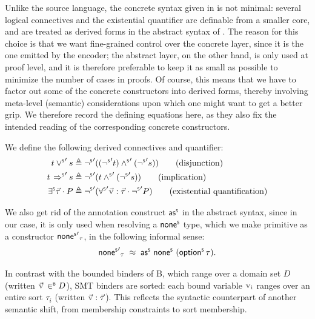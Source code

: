 Unlike the source language, the concrete syntax given in  is not minimal:
several logical connectives and the existential quantifier are definable from a smaller core,
and are treated as derived forms in the abstract syntax of .
The reason for this choice is that we want fine-grained control over the concrete layer, since it
is the one emitted by the encoder; the abstract layer, on the other hand, is only used at proof
level, and it is therefore preferable to keep it as small as possible to minimize the number
of cases in proofs.
Of course, this means that we have to factor out some of the concrete constructors into derived
forms, thereby involving meta-level (semantic) considerations upon which one might want to get
a better grip.
We therefore record the defining equations here, as they also fix the intended reading of the
corresponding concrete constructors.

\begin{definition}
  \label{def:smt-derived}
  We define the following derived connectives and quantifier:
  \begin{align*}
    t \abin{\orS} s                    & \triangleq \aop{\notS}((\aop{\notS} t) \abin{\andS} (\aop{\notS} s)) \tag{disjunction}      \\
    t \abin{\impS} s                   & \triangleq \aop{\notS}(t \abin{\andS} (\aop{\notS} s)) \tag{implication}                     \\
    \existsS \vec\tau \cdot P & \triangleq \aop{\notS}(\aop{\forallS} \vec{\var{v}} : \vec\tau \cdot \aop{\notS} P) \tag{existential quantification}
  \end{align*}
\end{definition}

We also get rid of the annotation construct \(\mathord{\mathsf{as}^{\scriptscriptstyle{\mathsf{S}}}}\) in the abstract syntax, since in our case, it is only used when resolving a \(\mathord{\mathsf{none}^{\scriptscriptstyle{\mathsf{S}}}}\) type, which we make primitive as a constructor \(\mathord{{\mathord{\mathsf{none}^{\scriptscriptstyle{\mathsf{S}}}}}^{\prime}}_{\tau}\), in the following informal sense:
\[
  \aop{\noneS}_{\tau} \;\approx\; \asS\ \noneS\ (\optS\tau).
\]

\begin{note}
  In contrast with the bounded binders of B, which range over a domain
  set \(D\) (written \(\vec{\var{v}} \inB D\)), SMT binders are sorted:
  each bound variable \(\var{v_i}\) ranges over an entire sort \(\tau_i\) (written
  \(\vec{\var{v}} : \vec\tau\)).
  This reflects the syntactic counterpart of another semantic shift, from membership constraints to
  sort membership.
\end{note}

